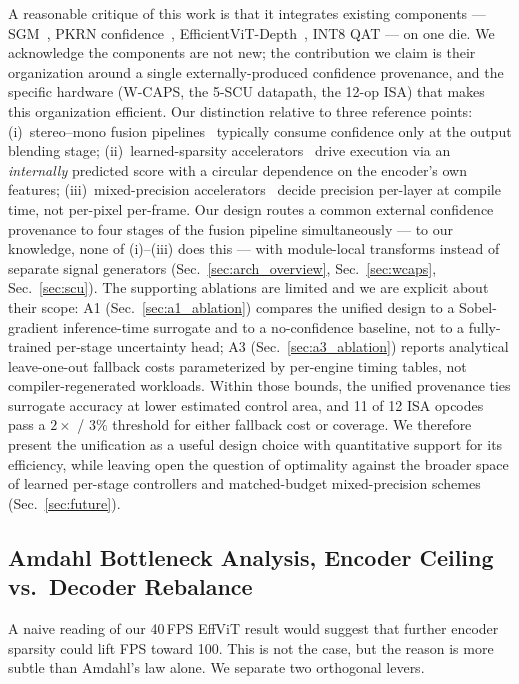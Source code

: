 \documentclass[journal]{IEEEtran}
\begin{document}
A reasonable critique of this work is that it integrates existing components --- SGM~\cite{hirschmuller2008sgm}, PKRN confidence~\cite{poggi2016pkrn}, EfficientViT-Depth~\cite{cai2023efficientvit}, INT8 QAT --- on one die. We acknowledge the components are not new; the contribution we claim is their organization around a single externally-produced confidence provenance, and the specific hardware (W-CAPS, the 5-SCU datapath, the 12-op ISA) that makes this organization efficient. Our distinction relative to three reference points: (i)~stereo--mono fusion pipelines~\cite{facil2019camconvs,wang2019pseudolidar,poggi2016pkrn} typically consume confidence only at the output blending stage; (ii)~learned-sparsity accelerators~\cite{you2023vitcod,wang2021spatten} drive execution via an \emph{internally} predicted score with a circular dependence on the encoder's own features; (iii)~mixed-precision accelerators~\cite{sharma2018bitfusion,park2019olaccel} decide precision per-layer at compile time, not per-pixel per-frame. Our design routes a common external confidence provenance to four stages of the fusion pipeline simultaneously --- to our knowledge, none of (i)--(iii) does this --- with module-local transforms instead of separate signal generators (Sec.~\ref{sec:arch_overview}, Sec.~\ref{sec:wcaps}, Sec.~\ref{sec:scu}). The supporting ablations are limited and we are explicit about their scope: A1 (Sec.~\ref{sec:a1_ablation}) compares the unified design to a Sobel-gradient inference-time surrogate and to a no-confidence baseline, not to a fully-trained per-stage uncertainty head; A3 (Sec.~\ref{sec:a3_ablation}) reports analytical leave-one-out fallback costs parameterized by per-engine timing tables, not compiler-regenerated workloads. Within those bounds, the unified provenance ties surrogate accuracy at lower estimated control area, and 11 of 12 ISA opcodes pass a $2\times$ / $3\%$ threshold for either fallback cost or coverage. We therefore present the unification as a useful design choice with quantitative support for its efficiency, while leaving open the question of optimality against the broader space of learned per-stage controllers and matched-budget mixed-precision schemes (Sec.~\ref{sec:future}).

\subsection{Amdahl Bottleneck Analysis, Encoder Ceiling vs.\ Decoder Rebalance}
\label{sec:amdahl}
A naive reading of our 40\,FPS EffViT result would suggest that further encoder sparsity could lift FPS toward 100. This is not the case, but the reason is more subtle than Amdahl's law alone. We separate two orthogonal levers.
\end{document}
